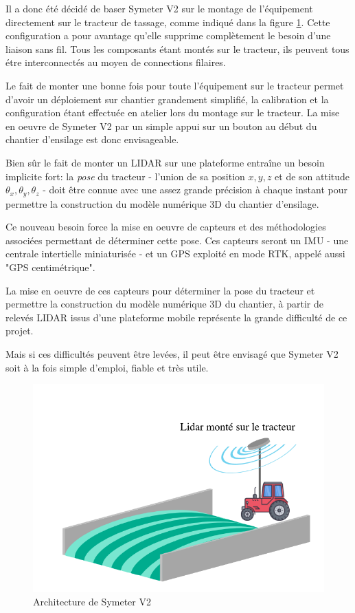 \documentclass[12pt,a4paper]{report}
\begin{document}
		\para Il a donc été décidé de baser Symeter V2 sur le montage de l'équipement directement sur le tracteur de tassage, comme indiqué dans la figure \ref{fig:lidarmobile}. Cette configuration a pour avantage qu'elle supprime complètement le besoin d'une liaison sans fil. Tous les composants étant montés sur le tracteur, ils peuvent tous étre interconnectés au moyen de connections filaires.
		
		\para Le fait de monter une bonne fois pour toute l'équipement sur le tracteur permet d'avoir un déploiement sur chantier grandement simplifié, la calibration et la configuration étant effectuée en atelier lors du montage sur le tracteur. La mise en oeuvre de Symeter V2 par un simple appui sur un bouton au début du chantier d'ensilage est donc envisageable.
		
		\para Bien sûr le fait de monter un LIDAR sur une plateforme entraîne un besoin implicite fort: la \textit{pose} du tracteur - l'union de sa position $x,y,z$ et de son attitude $\theta_x, \theta_y, \theta_z$ - doit être connue avec une assez grande précision à chaque instant pour permettre la construction du modèle numérique 3D du chantier d'ensilage.
		
		\para Ce nouveau besoin force la mise en oeuvre de capteurs et des méthodologies associées permettant de déterminer cette pose. Ces capteurs seront un IMU - une centrale intertielle miniaturisée - et un GPS exploité en mode RTK, appelé aussi "GPS centimétrique".
		
		\para La mise en oeuvre de ces capteurs pour déterminer la pose du tracteur et permettre la construction du modèle numérique 3D du chantier, à partir de relevés LIDAR issus d'une plateforme mobile représente la grande difficulté de ce projet.
		
		\para Mais si ces difficultés peuvent être levées, il peut être envisagé que Symeter V2 soit à la fois simple d'emploi, fiable et très utile.

		
		\begin{figure}
			\centering
			\includegraphics[width=0.6\linewidth]{img/LidarMobile}
			\caption[archiv2]{Architecture de Symeter V2}
			\label{fig:lidarmobile}
		\end{figure}
		
\end{document}
